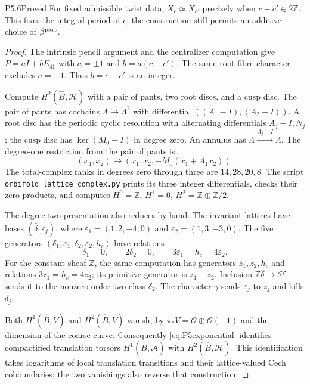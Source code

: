 \begin{statement}{P5.6}{Proved}
For fixed admissible twist data, $X_c\simeq X_{c'}$ precisely when
$c-c'\in2\mathbb Z$.  This fixes the integral period of $c$; the
construction still permits an additive choice of $\beta^{\rm part}$.
\end{statement}
\begin{proof}
The intrinsic pencil argument and the centralizer computation give
$P=aI+bE_{41}$ with $a=\pm1$ and $b=a(c-c')$.  The same root-fibre
character excludes $a=-1$.  Thus $b=c-c'$ is an integer.

Compute $H^2(\widehat B,\mathcal H)$ with a pair of pants, two root discs,
and a cusp disc.  The pair of pants has cochains $\Lambda\to\Lambda^2$
with differential $((A_1-I),(A_2-I))$.  A root disc has the periodic
cyclic resolution with alternating differentials $A_j-I,N_j$; the
cusp disc has $\ker(M_0-I)$ in degree zero.  An annulus has
$\Lambda\xrightarrow{A_j-I}\Lambda$.  The degree-one restriction from
the pair of pants is
\[
 (x_1,x_2)\longmapsto(x_1,x_2,-M_0(x_1+A_1x_2)).
\]
The total-complex ranks in degrees zero through three are $14,28,20,8$.
The script \texttt{orbifold\_lattice\_complex.py} prints its three
integer differentials, checks their zero products, and computes
$H^0=\mathbb Z$, $H^1=0$, $H^2=\mathbb Z\oplus\mathbb Z/2$.

The degree-two presentation also reduces by hand.  The invariant
lattices have bases $(\widehat\delta,\varepsilon_j)$, where
$\varepsilon_1=(1,2,-4,0)$ and $\varepsilon_2=(1,3,-3,0)$.
The five generators $(\delta_1,\varepsilon_1,\delta_2,\varepsilon_2,h_c)$
have relations
\begin{equation}\label{eq:P5H2}
 \delta_1=0,\qquad 2\delta_2=0,\qquad
 3\varepsilon_1=h_c=4\varepsilon_2.
\end{equation}
For the constant sheaf $\mathbb Z$, the same computation has generators
$z_1,z_2,h_c$ and relations $3z_1=h_c=4z_2$; its primitive generator is
$z_1-z_2$.  Inclusion $\mathbb Z\widehat\delta\to\mathcal H$ sends it
to the nonzero order-two class $\delta_2$.  The character $\gamma$
sends $\varepsilon_j$ to $z_j$ and kills $\delta_j$.

Both $H^1(\widehat B,V)$ and $H^2(\widehat B,V)$ vanish, by
$\pi_*V=\mathcal O\oplus\mathcal O(-1)$ and the dimension of the coarse
curve.  Consequently \eqref{eq:P5exponential} identifies compactified
translation torsors $H^1(\widehat B,\mathcal A)$ with
$H^2(\widehat B,\mathcal H)$.  This identification takes logarithms of
local translation transitions and their lattice-valued Cech
coboundaries; the two vanishings also reverse that construction.


\end{proof}
